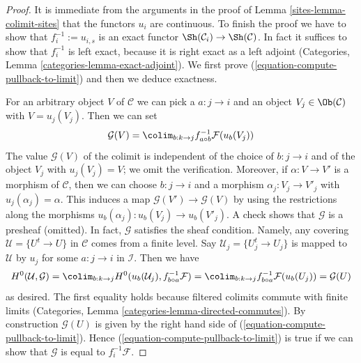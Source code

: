 \begin{proof}

It is immediate from the arguments in the proof of
Lemma \ref{sites-lemma-colimit-sites} that the functors $u_i$ are continuous.
To finish the proof we have to show that $f_i^{-1} := u_{i, s}$
is an exact functor $\Sh(\mathcal{C}_i) \to \Sh(\mathcal{C})$.
In fact it suffices to show that $f_i^{-1}$ is left exact, because
it is right exact as a left adjoint
(Categories, Lemma \ref{categories-lemma-exact-adjoint}).
We first prove (\ref{equation-compute-pullback-to-limit})
and then we deduce exactness.

\medskip\noindent
For an arbitrary object $V$ of $\mathcal{C}$ we can pick a $a : j \to i$
and an object $V_j \in \Ob(\mathcal{C})$ with $V = u_j(V_j)$. Then we
can set
$$
\mathcal{G}(V) = \colim_{b : k \to j} f_{a \circ b}^{-1}\mathcal{F}(u_b(V_j))
$$
The value $\mathcal{G}(V)$ of the colimit is independent of the choice
of $b : j \to i$ and of the object $V_j$ with $u_j(V_j) = V$; we omit
the verification. Moreover, if $\alpha : V \to V'$ is a morphism of
$\mathcal{C}$, then we can choose $b : j \to i$ and a morphism
$\alpha_j : V_j \to V'_j$ with $u_j(\alpha_j) = \alpha$. This induces
a map $\mathcal{G}(V') \to \mathcal{G}(V)$ by using the restrictions
along the morphisms $u_b(\alpha_j) : u_b(V_j) \to u_b(V'_j)$. A check
shows that $\mathcal{G}$ is a presheaf (omitted).
In fact, $\mathcal{G}$ satisfies the sheaf condition. Namely,
any covering $\mathcal{U} = \{U^t \to U\}$ in $\mathcal{C}$
comes from a finite level. Say $\mathcal{U}_j = \{U^t_j \to U_j\}$
is mapped to $\mathcal{U}$ by $u_j$ for some $a : j \to i$ in $\mathcal{I}$.
Then we have
$$
H^0(\mathcal{U}, \mathcal{G}) =
\colim_{b : k \to j} H^0(u_b(\mathcal{U}_j), f_{b \circ a}^{-1}\mathcal{F}) =
\colim_{b : k \to j} f_{b \circ a}^{-1}\mathcal{F}(u_b(U_j)) =
\mathcal{G}(U)
$$
as desired. The first equality holds because filtered colimits commute
with finite limits
(Categories, Lemma \ref{categories-lemma-directed-commutes}).
By construction $\mathcal{G}(U)$ is given by the right hand side of
(\ref{equation-compute-pullback-to-limit}).
Hence (\ref{equation-compute-pullback-to-limit}) is true if we can
show that $\mathcal{G}$ is equal to $f_i^{-1}\mathcal{F}$.


\end{proof}

